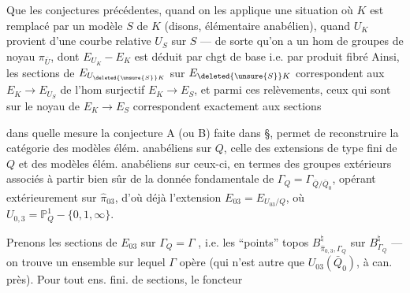 Que  les conjectures précédentes, quand on les applique  une situation où $K$ est remplacé par un modèle $S$ de $K$ (disons, élémentaire anabélien), quand $U_K$ provient d'une courbe relative $U_S$ sur $S$ — de sorte qu'on a un hom de groupes
de noyau $\pi_{\bar U}$, dont $E_{U_K}-E_K$ est déduit par chgt de base i.e. par produit fibré
Ainsi, les sections de $E_{U_{\deleted{\unsure{S}}K}}$ sur $E_{\deleted{\unsure{S}}K}$ correspondent aux   $E_K\longrightarrow E_{U_S}$ de l'hom surjectif $E_K\longrightarrow E_S$, et parmi ces relèvements, ceux qui sont   sur le noyau de $E_K\longrightarrow E_S$ correspondent exactement aux sections

dans quelle mesure la conjecture A
(ou B) faite dans  §, permet de
reconstruire la catégorie des modèles élém.
anabéliens sur $Q$,  celle des extensions
de type fini de $Q$ et des modèles
élém. anabéliens sur ceux-ci, en
termes des groupes extérieurs  associés
à partir bien sûr de la donnée
fondamentale de $\Gamma_Q=\Gamma_{\bar Q/\bar Q_0}$, opérant
extérieurement sur $\widehat\pi_{03}$, d'où déjà
l'extension $E_{03}=E_{U_{03}/Q}$, où
$U_{0,3}=\mathbb P^1_Q-\{0,1,\infty\}$.

Prenons les  sections de $E_{03}$ sur $\Gamma_Q=\Gamma$
,
i.e. les ``points''   topos $B_{\widehat\pi_{0,3},\Gamma_Q}^{\natural}$ sur
$B_{\Gamma_Q}^{\natural}$ — on trouve un ensemble sur
lequel $\Gamma$ opère (qui n'est autre que
$U_{03}(\bar Q_0)$, à  can. près). Pour
tout ens. fini.  de sections,  le foncteur

